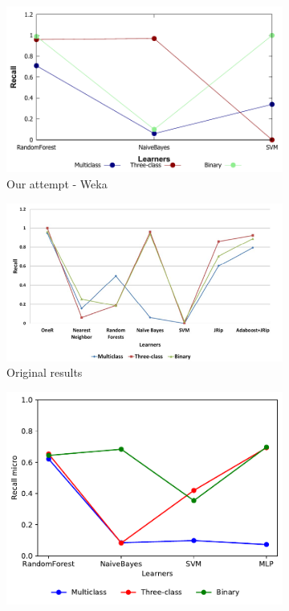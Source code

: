 \begin{figure}[H]
    \centering
    \begin{subfigure}[t]{0.4\textwidth}
        \includegraphics[width=\linewidth]{images/weka_recall}
        \caption{Our attempt - Weka}
    \end{subfigure}%
    \begin{subfigure}[t]{0.4\textwidth}
        \includegraphics[width=\linewidth]{images/weka_recall_cite.png}
        \caption{Original results \cite{borges_hink_machine_2014-1}}
    \end{subfigure}
    \begin{subfigure}[t]{0.4\textwidth}
        \includegraphics[width=\linewidth, page = 2]{images/recall}

\end{subfigure}
\end{figure}
